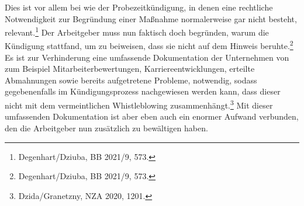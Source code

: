 Dies ist vor allem bei wie der Probezeitkündigung, in denen eine rechtliche Notwendigkeit zur Begründung einer Maßnahme normalerweise gar nicht besteht, relevant.\footnote{Degenhart/Dziuba, BB 2021/9, 573.}
Der Arbeitgeber muss nun faktisch doch begründen, warum die Kündigung stattfand, um zu beiweisen, dass sie nicht auf dem Hinweis beruhte.\footnote{Degenhart/Dziuba, BB 2021/9, 573.}
Es ist zur Verhinderung eine umfassende Dokumentation der Unternehmen von zum Beispiel Mitarbeiterbewertungen, Karriereentwicklungen, erteilte Abmahnungen sowie bereits aufgetretene Probleme, notwendig, sodass gegebenenfalls im Kündigungsprozess nachgewiesen werden kann, dass dieser nicht mit dem vermeintlichen Whistleblowing zusammenhängt.\footnote{Dzida/Granetzny, NZA 2020, 1201.}
Mit dieser umfassenden Dokumentation ist aber eben auch ein enormer Aufwand verbunden, den die Arbeitgeber nun zusätzlich zu bewältigen haben.



